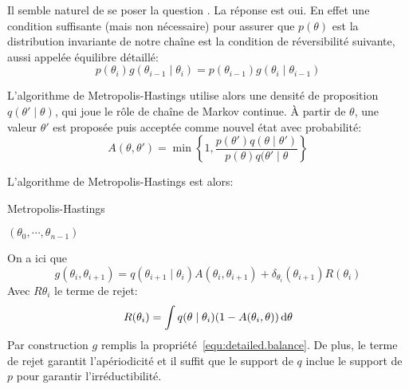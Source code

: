 Il semble naturel de se poser la question . La réponse est oui.
En effet une condition suffisante (mais non nécessaire) pour assurer que $p(\theta)$ est la distribution invariante de notre chaîne est la condition de réversibilité suivante, aussi appelée équilibre détaillé:
\begin{equation}\label{equ:detailed.balance}
    p( \theta_i ) g ( \theta_{i-1} \mid \theta_i ) = p( \theta_{i-1} ) g ( \theta_{i} \mid \theta_{i-1} )
\end{equation}

L'algorithme de Metropolis-Hastings utilise alors une densité de proposition $q (\theta' \mid \theta)$, qui joue le rôle de chaîne de Markov continue. À partir de $\theta$, une valeur $\theta'$ est proposée puis acceptée comme nouvel état avec probabilité:
\begin{equation*}
    A(\theta,\theta') = \min \left\{ 1 , \frac{p(\theta') q(\theta \mid \theta')}{p(\theta) q(\theta'\mid \theta} \right\}
\end{equation*}

L'algorithme de Metropolis-Hastings est alors:

\begin{algorithm}
\caption{Metropolis-Hastings} \label{metropolis.hastings.alg}
\begin{algorithmic}
        \Else {}
        \EndIf
    \EndFor
    \State \Return $(\theta_0,\cdots,\theta_{n-1})$
    \EndProcedure
\end{algorithmic}
\end{algorithm}

On a ici que
\begin{equation*}
    g( \theta_i , \theta_{i+1} ) = q ( \theta_{i+1} \mid \theta_{i} ) A(\theta_{i},\theta_{i+1}) + \delta_{\theta_{i}} ( \theta_{i+1} ) R(\theta_{i})
\end{equation*}
Avec $R\theta_{i}$ le terme de rejet:
\begin{equation*}
    R(\theta_{i}) = \int q ( \theta \mid \theta_{i} ) ( 1 - A(\theta_{i},\theta) ) \mathop{}\!\mathrm{d} \theta
\end{equation*}
Par construction $g$ remplis la propriété~\ref{equ:detailed.balance}. De plus, le terme de rejet garantit l'apériodicité et il suffit que le support de $q$ inclue le support de $p$ pour garantir l'irréductibilité.

